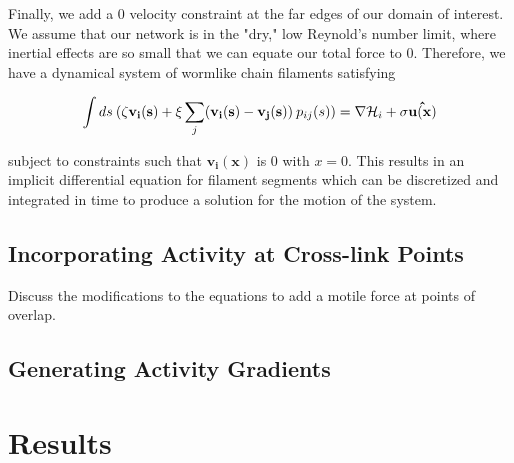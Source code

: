 \documentclass[pre,preprint]{revtex4-1}
\begin{document}
Finally, we add a 0 velocity constraint at the far edges of our domain of interest.  We assume that our network is in the "dry," low Reynold's number limit, where inertial effects are so small that we can equate our total force to 0.  Therefore, we have a dynamical system of wormlike chain filaments satisfying 

\begin{equation}
\int ds \: (\zeta\mathbf{v_i(s)} + \xi \sum _j(\mathbf{v_i(s)}-\mathbf{v_j(s)}) \: p_{ij}(s)) = \nabla {\cal H}_i + \sigma\mathbf{\hat{u(x)}}
\end{equation}

subject to constraints such that $\mathbf{v_i(x)}$ is 0 with $x=0$.  This results in an implicit differential equation for filament segments which can be discretized and integrated in time to produce a solution for the motion of the system.




\subsection{Incorporating Activity at Cross-link Points}

Discuss the modifications to the equations to add a motile force at points of overlap.




\subsection{Generating Activity Gradients}



































\section{Results}
\end{document}
